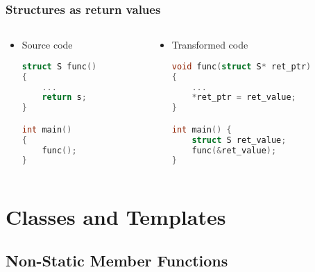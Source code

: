 \documentclass{beamer}
\begin{document}
\begin{frame}[fragile]
    \frametitle{Structures as return values}

    \begin{columns}
        \begin{column}[]{0.4\textwidth}
            \begin{itemize}
                \item Source code
                      \begin{lstlisting}[language=C]
struct S func()
{
    ...
    return s;
}

int main()
{
    func();
}
                    \end{lstlisting}
            \end{itemize}

        \end{column}

        \begin{column}[]{0.7\textwidth}
            \begin{itemize}
                \item Transformed code
                      \begin{lstlisting}[language=C]
void func(struct S* ret_ptr)
{
    ...
    *ret_ptr = ret_value;
}

int main() {
    struct S ret_value;
    func(&ret_value);
}
                \end{lstlisting}
            \end{itemize}
        \end{column}
    \end{columns}

\end{frame}

\section{Classes and Templates}

\subsection{Non-Static Member Functions}
\end{document}
